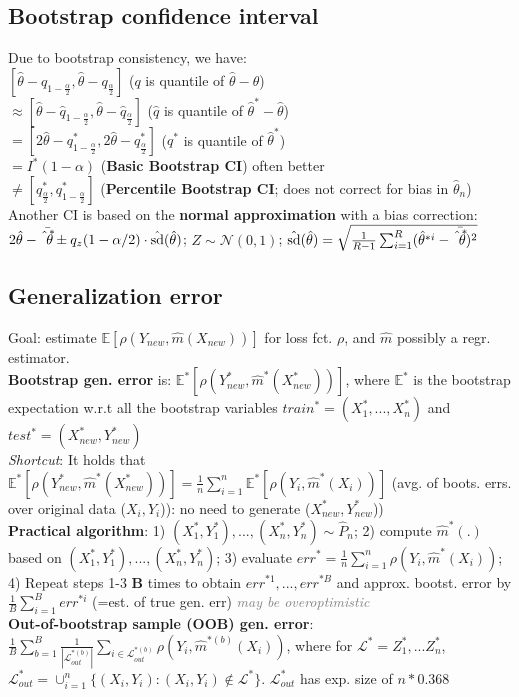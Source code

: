 \subsection*{Bootstrap confidence interval}
Due to bootstrap consistency, we have: \\
$[\hat{\theta} - q_{1-\frac{\alpha}{2}}, \hat{\theta} - q_{\frac{\alpha}{2}}]$ ($q$ is quantile of $\hat{\theta}-\theta$)\\
$\approx [\hat{\theta} - \hat{q}_{1-\frac{\alpha}{2}}, \hat{\theta} - \hat{q}_{\frac{\alpha}{2}}]$ ($\hat{q}$ is quantile of $\hat{\theta}^*-\hat{\theta}$) \\
$= [2\hat{\theta} - q_{1-\frac{\alpha}{2}}^*, 2\hat{\theta} - q_{\frac{\alpha}{2}}^*]$ ($q^*$ is quantile of $\hat{\theta}^*$)\\
$= I^*(1-\alpha)$ (\textbf{Basic Bootstrap CI}) \textrightarrow often better\\
$\neq [q_{\frac{\alpha}{2}}^*, q_{1-\frac{\alpha}{2}}^*]$ (\textbf{Percentile Bootstrap CI}; does not correct for bias in $\hat{\theta}_n$) \\
Another CI is based on the \textbf{normal approximation} with a bias correction: \\
$2\hat{\theta} - \Bar{\hat{\theta}^*} \pm q_z(1-\alpha/2)\cdot \hat{\text{sd}}(\hat{\theta})$; $Z \sim \mathcal{N}(0, 1)$; $\hat{\text{sd}}(\hat{\theta}) = \sqrt{\frac{1}{R-1} \sum_{i=1}^R(\hat{\theta}^{*i}-\Bar{\hat{\theta}^*})^2}$


\subsection*{Generalization error}
Goal: estimate $\mathbb{E}[\rho(Y_{new}, \hat{m}(X_{new}))]$ for loss fct. $\rho$, and $\hat{m}$ possibly a regr. estimator. \\
\textbf{Bootstrap gen. error} is: $\mathbb{E}^*[\rho(Y_{new}^*, \hat{m}^*(X_{new}^*))]$, where $\mathbb{E^*}$ is the bootstrap expectation w.r.t all the bootstrap variables ${train}^*=(X_1^*,...,X_n^*)$ and $test^*=(X_{new}^*,Y_{new}^*)$\\
\emph{Shortcut}: It holds that $\mathbb{E}^*[\rho(Y_{new}^*, \hat{m}^*(X_{new}^*))] = \frac{1}{n}\sum_{i=1}^n\mathbb{E}^*[\rho(Y_i, \hat{m}^*(X_i))]$ (avg. of boots. errs. over original data ($X_i, Y_i$)): no need to generate ($X^*_{new}, Y^*_{new}$))\\
\textbf{Practical algorithm}: 1) $(X^*_1, Y^*_1),...,(X^*_n, Y^*_n) \sim \hat{P}_n$; 2) compute $\hat{m}^*(.)$ based on $(X^*_1, Y^*_1),...,(X^*_n, Y^*_n)$; 3) evaluate ${err}^*=\frac{1}{n}\sum_{i=1}^n\rho(Y_i, \hat{m}^*(X_i))$; 4) Repeat steps 1-3 \textbf{B} times to obtain ${err}^{*1}, ..., {err}^{*B}$ and approx. bootst. error by $\frac{1}{B}\sum_{i=1}^B{err}^{*i}$ (=est. of true gen. err) \emph{\textcolor{gray}{\textrightarrow may be overoptimistic}}\\
\textbf{Out-of-bootstrap sample (OOB) gen. error}:\\
$ \frac{1}{B}\sum_{b=1}^B\frac{1}{|\mathcal{L}^{*(b)}_{out}|}\sum_{i\in\mathcal{L}^{*(b)}_{out}}\rho(Y_i, \hat{m}^{*(b)}(X_i))$, where for $\mathcal{L}^* = {Z_1^*,...Z_n^*}$, $\mathcal{L}_{out}^* = \cup_{i=1}^n\{(X_i, Y_i): (X_i, Y_i) \notin \mathcal{L}^*\}$. $\mathcal{L}_{out}^*$ has exp. size of $n*0.368$

